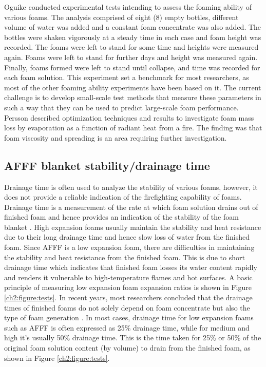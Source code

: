 Oguike \cite{oguike2013study} conducted experimental tests intending to assess the foaming ability of various foams. The analysis comprised of eight (8) empty bottles, different volume of water was added and a constant foam concentrate was also added. The bottles were shaken vigorously at a steady time in each case and foam height was recorded. The foams were left to stand for some time and heights were measured again. Foams were left to stand for further days and height was measured again. Finally, foams formed were left to stand until collapse, and time was recorded for each foam solution. This experiment set a benchmark for most researchers, as most of the other foaming ability experiments have been based on it.
The current challenge is to develop small-scale test methods that measure these parameters in such a way that they can be used to predict large-scale foam performance. Persson \cite{persson1992fire} described optimization techniques and results to investigate foam mass loss by evaporation as a function of radiant heat from a fire. The finding was that foam viscosity and spreading is an area requiring further investigation. 

\subsection{AFFF blanket stability/drainage time}
Drainage time is often used to analyze the stability of various foams, however, it does not provide a reliable indication of the firefighting capability of foams. Drainage time is a measurement of the rate at which foam solution drains out of finished foam and hence provides an indication of the stability of the foam blanket \cite{aamodt2020review}. High expansion foams usually maintain the stability and heat resistance due to their long drainage time and hence slow loss of water from the finished foam. 
Since AFFF is a low expansion foam, there are difficulties in maintaining the stability and heat resistance from the finished foam. This is due to short drainage time which indicates that finished foam losses its water content rapidly and renders it vulnerable to high-temperature flames and hot surfaces. A basic principle of measuring low expansion foam expansion ratios is shown in Figure \ref{ch2:figure:tests}. In recent years, most researchers concluded that the drainage times of finished foams do not solely depend on foam concentrate but also the type of foam generation \cite{martin2012fire}. In most cases, drainage time for low expansion foams such as AFFF is often expressed as 25\% drainage time, while for medium and high it’s usually 50\% drainage time. This is the time taken for 25\% or 50\% of the original foam solution content (by volume) to drain from the finished foam, as shown in Figure \ref{ch2:figure:tests}.

